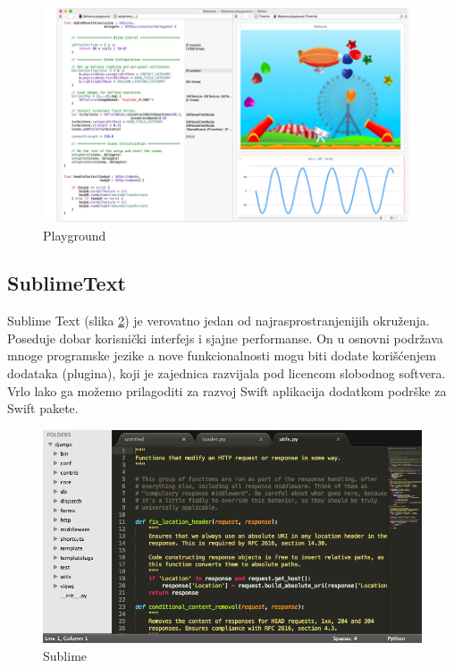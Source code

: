 \documentclass[a4paper]{article}
\begin{document}
\begin{figure}[h!]
\begin{center}
\includegraphics[scale=0.2]{playground.jpg}
\end{center}
\caption{Playground}
\label{fig:playground}
\end{figure}


\subsection{SublimeText}
\label{subsec:podnaslovSublimeText}

Sublime Text (slika \ref{fig:sublime}) je verovatno jedan od najrasprostranjenijih okruženja. Poseduje dobar korisnički interfejs i sjajne performanse. On u osnovni podržava mnoge programske jezike a nove funkcionalnosti mogu biti dodate korišćenjem dodataka (plugina), koji je zajednica razvijala pod licencom slobodnog softvera. Vrlo lako ga možemo prilagoditi za razvoj Swift aplikacija dodatkom podrške za Swift pakete.

\begin{figure}[h!]
\begin{center}
\includegraphics[scale=0.25]{sublime.png}
\end{center}
\caption{Sublime}
\label{fig:sublime}
\end{figure}
\end{document}
